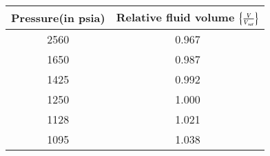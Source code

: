 \begin{tabular}[12pt]{|c|c|}
\hline
\textbf{Pressure}(in psia)&\textbf{Relative fluid volume} $\left\{\frac{V}{V_{sat}}\right\}$\\
\hline
2560&0.967\\
\hline
1650&0.987\\
\hline
1425&0.992\\
\hline
1250&1.000\\
\hline
1128&1.021\\
\hline
1095&1.038\\
\hline
\end{tabular}